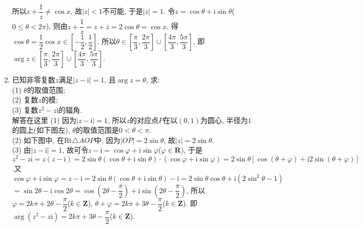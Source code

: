 \documentclass[10pt,a4paper]{article}
\begin{document}
\begin{enumerate}[1.]
所以$z+\dfrac 1z\ne \cos x$,
故$|z|<1$不可能, 于是$|z|=1$.
令$z=\cos \theta +\mathrm{i}\sin \theta$($0\le \theta <2\pi$),
则由$z+\dfrac 1z=z+\overline z=2\cos \theta =\cos x$,
得$\cos \theta =\dfrac 12\cos x\in [-\dfrac 12,\dfrac 12]$.
所以$\theta \in [\dfrac{\pi }3,\dfrac{2\pi }3]\cup [\dfrac{4\pi }3,\dfrac{5\pi }3]$, 即$\arg z\in [\dfrac{\pi }3,\dfrac{2\pi }3]\cup [\dfrac{4\pi }3,\dfrac{5\pi }3]$.
\item 已知非零复数$z$满足$|z-\mathrm{i}|=1$, 且$\arg z=\theta$, 求:\\
(1) $\theta$的取值范围;\\
(2) 复数$z$的模;\\
(3) 复数$z^2-z\mathrm{i}$的辐角.\\
解答在这里  (1) 因为$|z-\mathrm{i}|=1$, 所以$z$的对应点$P$在以$(0, 1)$为圆心, 半径为$1$的圆上(如下图左), $\theta$的取值范围是$0<\theta <\pi$.\\
(2) 如下图中, 在Rt$\triangle AOP$中, 因为$|OP|=2\sin \theta$, 故$|z|=2\sin \theta$.\\
(3) 由$|z-\mathrm{i}|=1$, 故可令$z-\mathrm{i}=\cos \varphi +\mathrm{i}\sin \varphi$($\varphi \in \mathbf{R}$),
于是$z^2-z\mathrm{i}=z(z-\mathrm{i})=2\sin \theta (\cos \theta +\mathrm{i}\sin \theta)\cdot (\cos \varphi +\mathrm{i}\sin \varphi)=2\sin \theta [\cos (\theta +\varphi)+\mathrm{i}2\sin (\theta +\varphi)]$.又$\cos \varphi +\mathrm{i}\sin \varphi =z-\mathrm{i}=2\sin \theta (\cos \theta +\mathrm{i}\sin \theta)-\mathrm{i}=2\sin \theta \cos \theta +\mathrm{i}(2\sin ^2\theta -1)$
$=\sin 2\theta -\mathrm{i}\cos 2\theta =\cos (2\theta -\dfrac{\pi }2)+\mathrm{i}\sin (2\theta -\dfrac{\pi }2)$,
所以$\varphi =2k\pi +2\theta -\dfrac{\pi }2$($k\in \mathbf{Z}$), $\theta +\varphi =2k\pi +3\theta -\dfrac{\pi }2$($k\in \mathbf{Z}$). 即$\arg (z^2-z\mathrm{i})=2k\pi +3\theta -\dfrac{\pi }2$($k\in \mathbf{Z}$).
\begin{center}
    \begin{tikzpicture}[>=latex,scale = 1.5]

\end{tikzpicture}
\end{center}
\end{enumerate}
\end{document}
